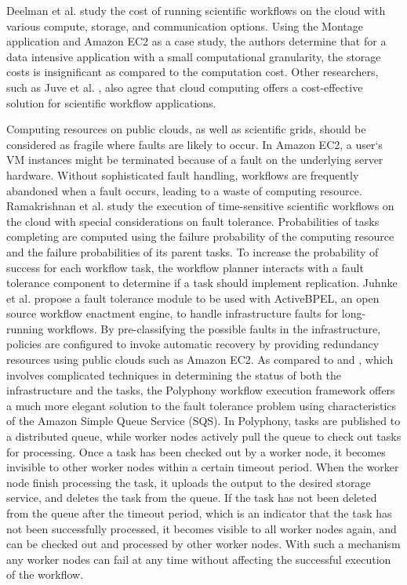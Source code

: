 Deelman et al. \cite{deelman2008cost} study the cost of running scientific workflows on the cloud with various compute, storage, and communication options. Using the Montage application and Amazon EC2 as a case study, the authors determine that for a data intensive application with a small computational granularity, the storage costs is insignificant as compared to the computation cost. Other researchers, such as Juve et al. \cite{juve2009scientific} \cite{juve2010data} \cite{juve2012evaluation}, also agree that cloud computing offers a cost-effective solution for scientific workflow applications.

Computing resources on public clouds, as well as scientific grids, should be considered as fragile where faults are likely to occur. In Amazon EC2, a user`s VM instances might be terminated because of a fault on the underlying server hardware. Without sophisticated fault handling, workflows are frequently abandoned when a fault occurs, leading to a waste of computing resource. Ramakrishnan et al. \cite{ramakrishnan2009vgrads} study the execution of time-sensitive scientific workflows on the cloud with special considerations on fault tolerance. Probabilities of tasks completing are computed using the failure probability of the computing resource and the failure probabilities of its parent tasks. To increase the probability of success for each workflow task, the workflow planner interacts with a fault tolerance component to determine if a task should implement replication. Juhnke et al. \cite{juhnke2009fault} propose a fault tolerance module to be used with ActiveBPEL, an open source workflow enactment engine, to handle infrastructure faults for long-running workflows. By pre-classifying the possible faults in the infrastructure, policies are configured to invoke automatic recovery by providing redundancy resources using public clouds such as Amazon EC2. As compared to \cite{ramakrishnan2009vgrads} and \cite{juhnke2009fault}, which involves complicated techniques in determining the status of both the infrastructure and the tasks, the Polyphony workflow execution framework \cite{shams2010polyphony} offers a much more elegant solution to the fault tolerance problem using characteristics of the Amazon Simple Queue Service (SQS). In Polyphony, tasks are published to a distributed queue, while worker nodes actively pull the queue to check out tasks for processing. Once a task has been checked out by a worker node, it becomes invisible to other worker nodes within a certain timeout period. When the worker node finish processing the task, it uploads the output to the desired storage service, and deletes the task from the queue. If the task has not been deleted from the queue after the timeout period, which is an indicator that the task has not been successfully processed, it becomes visible to all worker nodes again, and can be checked out and processed by other worker nodes. With such a mechanism any worker nodes can fail at any time without affecting the successful execution of the workflow.

